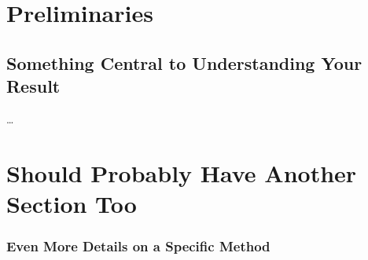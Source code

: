 \documentclass[../techreport.tex]{subfiles}
\begin{document}
\section{Preliminaries}
\label{sec:prelim}
\subsection{Something Central to Understanding Your Result}
\ldots
\lipsum[9]
\section{Should Probably Have Another Section Too}
\lipsum[10]
\subsubsection{Even More Details on a Specific Method}
\lipsum[11]
\end{document}
